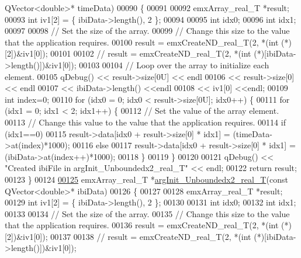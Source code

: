 \begin{DoxyCode}
      QVector<double>* timeData)
00090 \{
00091 
00092     emxArray\_real\_T *result;
00093     \textcolor{keywordtype}{int} iv1[2] = \{ ibiData->length(), 2 \};
00094 
00095     \textcolor{keywordtype}{int} idx0;
00096     \textcolor{keywordtype}{int} idx1;
00097 
00098     \textcolor{comment}{// Set the size of the array.}
00099     \textcolor{comment}{// Change this size to the value that the application requires.}
00100     result = emxCreateND\_real\_T(2, *(\textcolor{keywordtype}{int} (*)[2])&iv1[0]);
00101 
00102     \textcolor{comment}{//   result = emxCreateND\_real\_T(2, *(int (*)[ibiData->length()])&iv1[0]);}
00103 
00104     \textcolor{comment}{// Loop over the array to initialize each element.}
00105     qDebug() << result->size[0U] << endl
00106             << result->size[0] << endl
00107             << ibiData->length() <<endl
00108             << iv1[0] <<endl;
00109     \textcolor{keywordtype}{int} index=0;
00110     \textcolor{keywordflow}{for} (idx0 = 0; idx0 < result->size[0U]; idx0++) \{
00111         \textcolor{keywordflow}{for} (idx1 = 0; idx1 < 2; idx1++) \{
00112             \textcolor{comment}{// Set the value of the array element.}
00113             \textcolor{comment}{// Change this value to the value that the application requires.}
00114             \textcolor{keywordflow}{if} (idx1==0)
00115                 result->data[idx0 + result->size[0] * idx1] = (timeData->at(index)*1000);
00116             \textcolor{keywordflow}{else}
00117                 result->data[idx0 + result->size[0] * idx1] = (ibiData->at(index++)*1000);
00118         \}
00119     \}
00120 
00121     qDebug() << \textcolor{stringliteral}{"Created ibiFile in argInit\_Unboundedx2\_real\_T"} << endl;
00122     \textcolor{keywordflow}{return} result;
00123 \}
00124 
\hypertarget{hrvanalysis_8cpp_source.tex_l00125}{}\hyperlink{group__HRV-Analysis_ga95c104a451f12859980435cf9353fc76}{00125} emxArray\_real\_T *\hyperlink{group__HRV-Analysis_ga97aad354e1ec35fab4e98f111f4ed4b4}{argInit\_Unboundedx2\_real\_T}(\textcolor{keyword}{const} QVector<double>* ibiData)
00126 \{
00127 
00128     emxArray\_real\_T *result;
00129     \textcolor{keywordtype}{int} iv1[2] = \{ ibiData->length(), 2 \};
00130 
00131     \textcolor{keywordtype}{int} idx0;
00132     \textcolor{keywordtype}{int} idx1;
00133 
00134     \textcolor{comment}{// Set the size of the array.}
00135     \textcolor{comment}{// Change this size to the value that the application requires.}
00136     result = emxCreateND\_real\_T(2, *(\textcolor{keywordtype}{int} (*)[2])&iv1[0]);
00137 
00138     \textcolor{comment}{//   result = emxCreateND\_real\_T(2, *(int (*)[ibiData->length()])&iv1[0]);}

\end{DoxyCode}
